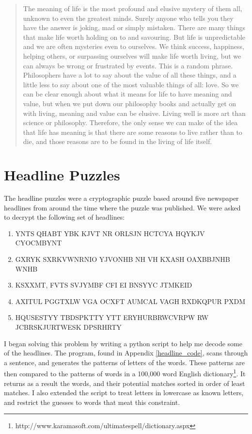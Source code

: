\documentclass[11pt,a4paper,twoside]{article}
\begin{document}
\begin{quote}
\small
\raggedright
The meaning of life is the most profound and elusive mystery of them all,
unknown to even the greatest minds. Surely anyone who tells you they have the
answer is joking, mad or simply mistaken.  There are many things that make life
worth holding on to and savouring. But life is unpredictable and we are often
mysteries even to ourselves. We think success, happiness, helping others, or
surpassing ourselves will make life worth living, but we can always be wrong or
frustrated by events.  This is a random phrase.  Philosophers have a lot to say
about the value of all these things, and a little less to say about one of the
most valuable things of all: love. So we can be clear enough about what it
means for life to have meaning and value, but when we put down our philosophy
books and actually get on with living, meaning and value can be elusive. Living
well is more art than science or philosophy. Therefore,  the only sense we can
make of the idea that life has meaning is that there are some reasons to live
rather than to die, and those reasons are to be found in the living of life
itself.
\end{quote}

\vfill
\pagebreak
\section{Headline Puzzles}
The headline puzzles were a cryptographic puzzle based around five newspaper
headlines from around the time where the puzzle was published. We were asked to
decrypt the following set of headlines: 

\begin{enumerate}[noitemsep]
\item YNTS QHABT YBK KJVT NR ORLSJN HCTCYA HQYKJV CYOCMBYNT 
\item GXRYK SXRKVWNRNIO YJVONHB NH VH KXASH OAXBBJNHB WNHB 
\item KSXXMT, FVTS SVJYMBF CFI EI BNSYYC JTMKEID 
\item AXITUL PGGTXLW VGA OCXFT AUMCAL VAGH RXDKQPUR PXDM
\item HQUSESTYY TBDSPKTTY YTT ERYHURBRWCVRPW RW JCBRSKJURTWESK DPSRHRTY
\end{enumerate}

I began solving this problem by writing a python script to help me decode some
of the headlines. The program, found in Appendix \ref{headline_code}, scans
through a sentence, and generates the patterns of letters of the words. These
patterns are then compared to the patterns of words in a 100,000 word English
dictionary\footnote{http://www.karamasoft.com/ultimatespell/dictionary.aspx}.
It returns as a result the words, and their potential matches sorted in order
of least matches. I also extended the script to treat letters in lowercase as
known letters, and restrict the guesses to words that meat this constraint.  
\end{document}
